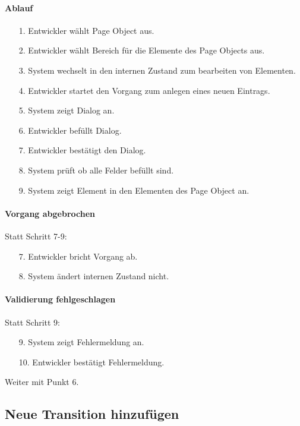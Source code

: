 \paragraph{Ablauf}

\begin{itemize}[itemsep=0pt]
\item[1.] Entwickler wählt Page Object aus.
\item[2.] Entwickler wählt Bereich für die Elemente des Page Objects aus. 
\item[3.] System wechselt in den internen Zustand zum bearbeiten von Elementen.
\item[4.] Entwickler startet den Vorgang zum anlegen eines neuen Eintrags.
\item[5.] System zeigt Dialog an. 
\item[6.] Entwickler befüllt Dialog.
\item[7.] Entwickler bestätigt den Dialog.
\item[8.] System prüft ob alle Felder befüllt sind.
\item[9.] System zeigt Element in den Elementen des Page Object an.
\end{itemize}

\paragraph{Vorgang abgebrochen}
Statt Schritt 7-9:
\begin{itemize}[itemsep=0pt]
\item[7.] Entwickler bricht Vorgang ab. 
\item[8.] System ändert internen Zustand nicht. 
\end{itemize}

\paragraph{Validierung fehlgeschlagen}
Statt Schritt 9:
\begin{itemize}
\item[9.] System zeigt Fehlermeldung an. 
\item[10.] Entwickler bestätigt Fehlermeldung. 
\end{itemize}
Weiter mit Punkt 6. 


\subsection{Neue Transition hinzufügen}
\label{sec:neue_transition_hinzufügen}

